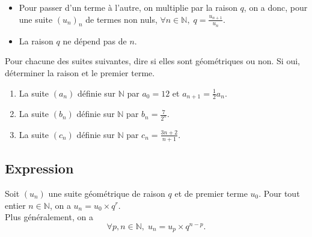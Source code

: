 \documentclass[11pt]{article}
\begin{document}
\begin{rmq}
  \begin{itemize}
    \item Pour passer d'un terme à l'autre, on multiplie par la raison $q$, on a
      donc, pour une suite $(u_n)_n$ de termes non nuls,
      $\forall n\in\mathbb{N},\;q=\frac{u_{n+1}}{u_n}$.
    \item La raison $q$ ne dépend pas de $n$.
  \end{itemize}
\end{rmq}

\begin{app}
  Pour chacune des suites suivantes, dire si elles sont géométriques ou non. Si
  oui, déterminer la raison et le premier terme.
  \begin{enumerate}
    \item La suite $\left( a_n \right)$ définie sur $\mathbb{N}$ par $a_0=12$ et
      $a_{n+1} = \frac{1}{2}a_n$.
    \item La suite $\left( b_n \right)$ définie sur $\mathbb{N}$ par $b_n =
      \frac{7}{2^n}$.
    \item La suite $\left( c_n \right)$ définie sur $\mathbb{N}$ par $c_n =
      \frac{3n+2}{n+1}$.
  \end{enumerate}
\end{app}

\subsection{Expression}
\begin{prop}
  Soit $(u_n)$ une suite géométrique de raison $q$ et de premier terme $u_0$.
  Pour tout entier $n\in\mathbb{N}$, on a $u_n = u_0 \times q^r$.\\
  Plus généralement, on a
  \[
    \forall p,n\in\mathbb{N},\; u_n = u_p \times q^{n-p}.
  \]
  
  \begin{center}
  \end{center}
\end{prop}
\end{document}
